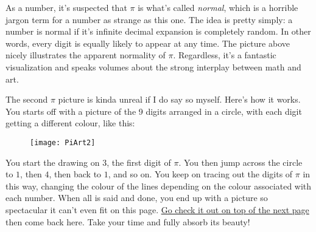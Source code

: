 \documentclass[11pt,titlepage]{article}
\begin{document}
As a number, it's suspected that $\pi$ is what's called \textit{normal}, which is a horrible jargon term for a number as strange as this one. The idea is pretty simply: a number is normal if it's infinite decimal expansion is completely random. In other words, every digit is equally likely to appear at any time. The picture above nicely illustrates the apparent normality of $\pi$.	Regardless, it's a fantastic visualization and speaks volumes about the strong interplay between math and art.\vspace{\bigskipamount}

The second $\pi$ picture is kinda unreal if I do say so myself. Here's how it works. You starts off with a picture of the 9 digits arranged in a circle, with each digit getting a different colour, like this:
\begin{figure}[h]
\centering
\texttt{[image: PiArt2]}
\end{figure}

You start the drawing on $3$, the first digit of $\pi$. You then jump across the circle to $1$, then $4$, then back to $1$, and so on. You keep on tracing out the digits of $\pi$ in this way, changing the colour of the lines depending on the colour associated with each number. When all is said and done, you end up with a picture so spectacular it can't even fit on this page.\label{text} \hyperref[PiArt]{Go check it out on top of the next page} then come back here. Take your time and fully absorb its beauty!
\end{document}
